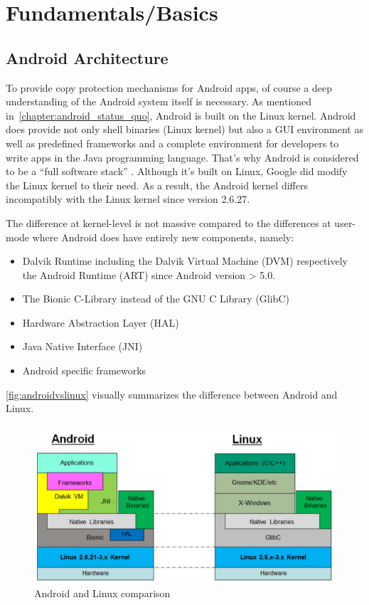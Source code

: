 \chapter{Fundamentals/Basics}\label{chapter:android_basics}

\section{Android Architecture}\label{section:android_architecture}
To provide copy protection mechanisms for Android apps,
of course a deep understanding of the Android system itself
is necessary. As mentioned in~\autoref{chapter:android_status_quo},
Android is built on the Linux kernel. Android does provide not
only shell binaries (Linux kernel) but also a GUI environment
as well as predefined frameworks and a complete environment
for developers to write apps in the Java programming language.
That's why Android is considered to be a ``full software stack''
\parencite{levin}. Although it's built on Linux,
Google did modify the Linux kernel to their need.
As a result, the Android kernel differs
incompatibly with the Linux kernel since version 2.6.27.

The difference at kernel-level is not massive compared to
the differences at user-mode where Android does have entirely new
components, namely:

\begin{itemize}
\item Dalvik Runtime including the Dalvik Virtual Machine (DVM)
respectively the Android Runtime (ART) since Android version > 5.0.
\item The Bionic C-Library instead of the GNU C Library (GlibC)
\item Hardware Abstraction Layer (HAL)
\item Java Native Interface (JNI)
\item Android specific frameworks
\end{itemize}

\autoref{fig:androidvslinux} visually summarizes the difference
between Android and Linux.

\begin{figure}[htb]
  \includegraphics[width=\textwidth]{figures/androidvslinux}
  \caption[Android vs Linux]{Android and Linux comparison
  ~\parencite{levin}}
  \label{fig:androidvslinux}
\end{figure}

